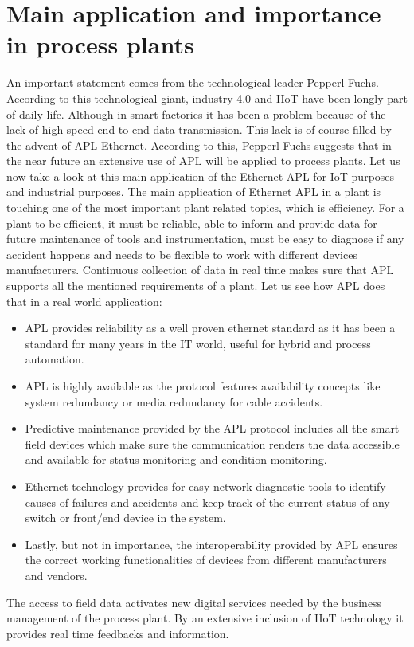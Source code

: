 \documentclass[conference]{IEEEtran}
\begin{document}
\section{Main application and importance in process plants}
An important statement comes from the technological leader Pepperl-Fuchs. According to this technological giant, industry 4.0 and IIoT have been longly part of daily life. Although in smart factories it has been a problem because of the lack of high speed end to end data transmission. This lack is of course filled by the advent of APL Ethernet. According to this, Pepperl-Fuchs suggests that in the near future an extensive use of APL will be applied to process plants.
Let us now take a look at this main application of the Ethernet APL for IoT purposes and industrial purposes.
The main application of Ethernet APL in a plant is touching one of the most important plant related topics, which is efficiency. For a plant to be efficient, it must be reliable, able to inform and provide data for future maintenance of tools and instrumentation, must be easy to diagnose if any accident happens and needs to be flexible to work with different devices manufacturers. Continuous collection of data in real time makes sure that APL supports all the mentioned requirements of a plant. Let us see how APL does that in a real world application:
\begin{itemize}
\item APL provides reliability as a well proven ethernet standard as it has been a standard for many years in the IT world, useful for hybrid and process automation.
\item APL is highly available as the protocol features availability concepts like system redundancy or media redundancy for cable accidents.
\item Predictive maintenance provided by the APL protocol includes all the smart field devices which make sure the communication renders the data accessible and available for status monitoring and condition monitoring.
\item Ethernet technology provides for easy network diagnostic tools to identify causes of failures and accidents and keep track of the current status of any switch or front/end device in the system.
\item Lastly, but not in importance, the interoperability provided by APL ensures the correct working functionalities of devices from different manufacturers and vendors.
\end{itemize}
The access to field data activates new digital services needed by the business management of the process plant. By an extensive inclusion of IIoT technology it provides real time feedbacks and information.
\end{document}

